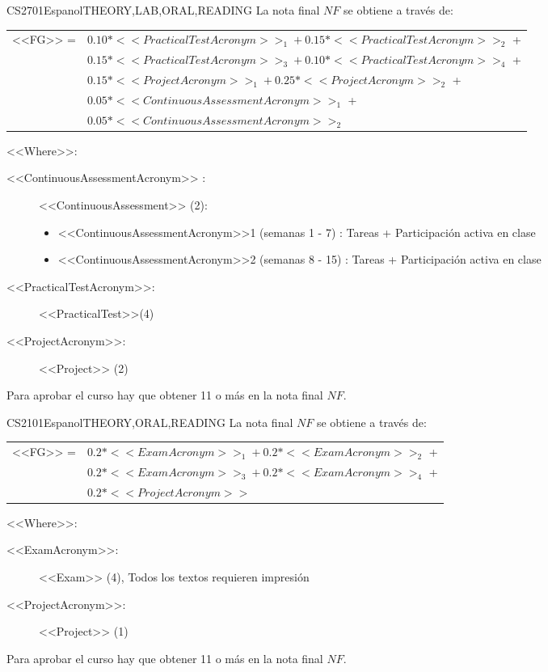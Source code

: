     \begin{evaluation}{CS2701}{Espanol}{THEORY,LAB,ORAL,READING}
    La nota final $NF$ se obtiene a través de:
    
    \begin{tabular}{cl}
      <<FG>> =  & $0.10*<<PracticalTestAcronym>>_{1} + 0.15*<<PracticalTestAcronym>>_{2}$ + \\
                & $0.15*<<PracticalTestAcronym>>_{3} + 0.10*<<PracticalTestAcronym>>_{4}$ +\\ 
                & $0.15*<<ProjectAcronym>>_{1} + 0.25*<<ProjectAcronym>>_{2}$ + \\
                & $0.05*<<ContinuousAssessmentAcronym>>_{1}$ + \\
                & $0.05*<<ContinuousAssessmentAcronym>>_{2}$ 
    \end{tabular}
    
    \noindent <<Where>>:
    \begin{description}
        \item[<<ContinuousAssessmentAcronym>> :] <<ContinuousAssessment>> (2):
    \begin{itemize}
               \item  <<ContinuousAssessmentAcronym>>1 (semanas 1 - 7) : Tareas + Participación activa en clase 
                \item <<ContinuousAssessmentAcronym>>2 (semanas 8 - 15) : Tareas + Participación activa en clase 
         \end{itemize}
        \item[<<PracticalTestAcronym>>:] <<PracticalTest>>(4)
        \item[<<ProjectAcronym>>:] <<Project>> (2)     
    \end{description}
    \noindent Para aprobar el curso hay que obtener 11 o más en la nota final $NF$.
    \end{evaluation}
    
    \begin{evaluation}{CS2101}{Espanol}{THEORY,ORAL,READING}
    La nota final $NF$ se obtiene a través de:
    
    \begin{tabular}{cl}
        <<FG>> = & $0.2* <<ExamAcronym>>_{1} + 0.2* <<ExamAcronym>>_{2}$ + \\
                 & $0.2*<<ExamAcronym>>_{3} + 0.2*<<ExamAcronym>>_{4}$ + \\
                 & $0.2*<<ProjectAcronym>>$
   \end{tabular}

    
    \noindent <<Where>>:
    \begin{description}
        \item[<<ExamAcronym>>:] <<Exam>> (4), Todos los textos requieren impresión
        \item[<<ProjectAcronym>>:] <<Project>> (1)
    \end{description}
    \noindent Para aprobar el curso hay que obtener 11 o más en la nota final $NF$.
    \end{evaluation}
    
